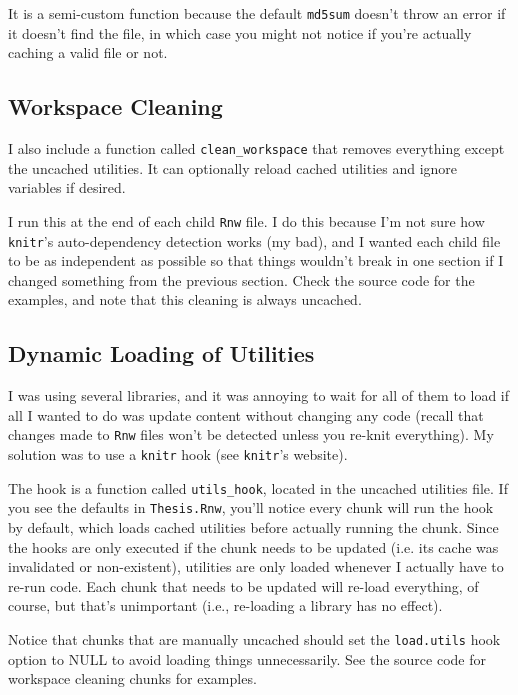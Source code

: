 It is a semi-custom function because the default \texttt{md5sum} doesn't throw an error if it doesn't find the file, in which case you might not notice if you're actually caching a valid file or not.

\subsection{Workspace Cleaning}

I also include a function called \texttt{clean\_workspace} that removes everything except the uncached utilities. It can optionally reload cached utilities and ignore variables if desired. 

I run this at the end of each child \texttt{Rnw} file. I do this because I'm not sure how \texttt{knitr}'s auto-dependency detection works (my bad), and I wanted each child file to be as independent as possible so that things wouldn't break in one section if I changed something from the previous section. Check the source code for the examples, and note that this cleaning is always uncached.

\subsection{Dynamic Loading of Utilities}

I was using several libraries, and it was annoying to wait for all of them to load if all I wanted to do was update content without changing any \R{} code (recall that changes made to \texttt{Rnw} files won't be detected unless you re-knit everything). My solution was to use a \texttt{knitr} hook (see \texttt{knitr}'s website).

The hook is a function called \texttt{utils\_hook}, located in the uncached utilities file. If you see the defaults in \texttt{Thesis.Rnw}, you'll notice every chunk will run the hook by default, which loads cached utilities before actually running the chunk. Since the hooks are only executed if the chunk needs to be updated (i.e. its cache was invalidated or non-existent), utilities are only loaded whenever I actually have to re-run \R{} code. Each chunk that needs to be updated will re-load everything, of course, but that's unimportant (i.e., re-loading a library has no effect).

Notice that chunks that are manually uncached should set the \texttt{load.utils} hook option to NULL to avoid loading things unnecessarily. See the source code for workspace cleaning chunks for examples.

